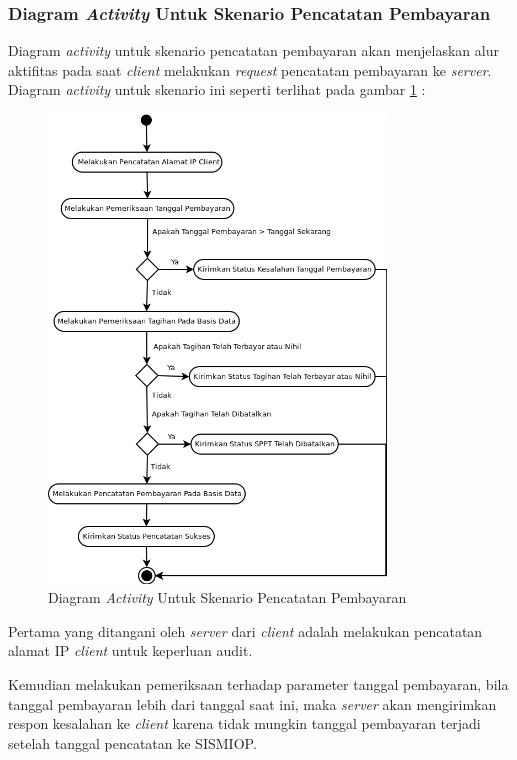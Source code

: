 \documentclass[pdftex,12pt, oneside]{article}
\begin{document}
\subsubsection{Diagram \textit{Activity} Untuk Skenario Pencatatan Pembayaran}

Diagram \textit{activity} untuk skenario pencatatan pembayaran akan menjelaskan alur aktifitas pada saat \textit{client} melakukan \textit{request} pencatatan pembayaran ke \textit{server}. Diagram \textit{activity} untuk skenario ini seperti terlihat pada gambar \ref{fig:uml-act-bayar} :

\begin{figure}[H]
  \centering
  \includegraphics[width=0.8\textwidth]{./resources/uml/uml-act-bayar}
  \caption{Diagram \textit{Activity} Untuk Skenario Pencatatan Pembayaran}
  \label{fig:uml-act-bayar}
\end{figure}

Pertama yang ditangani oleh \textit{server} dari \textit{client} adalah melakukan pencatatan alamat IP \textit{client} untuk keperluan audit. 

Kemudian melakukan pemeriksaan terhadap parameter tanggal pembayaran, bila tanggal pembayaran lebih dari tanggal saat ini, maka \textit{server} akan mengirimkan respon kesalahan ke \textit{client} karena tidak mungkin tanggal pembayaran terjadi setelah tanggal pencatatan ke SISMIOP.
\end{document}
